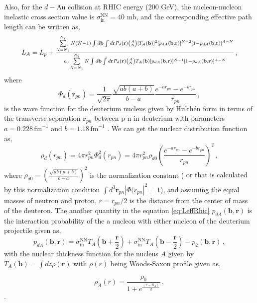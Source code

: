 \documentclass[11pt,onecolumn]{article}
\newcommand{\redflag}[1]{{\color{red} #1}}
\newcommand{\beq}{\begin{equation}}
\newcommand{\eeq}{\end{equation}}
\begin{document}
Also, for the $d-$Au collision at RHIC energy (200 GeV), the nucleon-nucleon inelastic cross section value is $\sigma^{\text{NN}}_{\text{in}} = 40$ mb, and the corresponding effective path length can be written as,
\beq
\resizebox{.9\hsize}{!}{$
L_A = L_p + \frac{\sum\limits_{N=N_1}^{N_2} N(N-1) \int d\textbf{b} \int d\textbf{r} P_d(\textbf{r}) \binom{A}{N} [T_A(\textbf{b})]^2 [p_{dA}(\textbf{b},\textbf{r})]^{N-2} [1-p_{dA}(\textbf{b},\textbf{r})]^{A-N} }{\rho_0 \sum\limits_{N=N_1}^{N_2} N \int d\textbf{b} \int d\textbf{r} P_d(\textbf{r}) \binom{A}{N} T_A(\textbf{b}) [p_{dA}(\textbf{b},\textbf{r})]^{N-1} [1-p_{dA}(\textbf{b},\textbf{r})]^{A-N}} \, ,
$}
\label{eq:LeffRhic}
\eeq
%
where 
%
\beq
\Phi_d(\textbf{r}_{pn}) = \frac{1}{\sqrt{2\pi}} \frac{\sqrt{ab (a+b)}}{b-a}  \frac{e^{-ar_{pn}}-e^{-br_{pn}}}{r_{pn}} \, ,
\label{eq:deuteriumWF}
\eeq
%
is the wave function for the \href{https://www.bnl.gov/userscenter/thesis/past-competitions/2022/thesis/thesis_niveditha_ramasubramanian.pdf}{deuterium nucleus} given by Hulth\'en form \cite{Miller:2007ri, 2021APS..DNP.QH004R} in terms of the transverse separation $\textbf{r}_{pn}$ between p-n in deuterium with parameters $a = 0.228 \, \text{fm}^{-1}$ and $b = 1.18 \, \text{fm}^{-1}$ \cite{PHENIX:2003qdw}. We can get the nuclear distribution function as,
%
\beq
\rho_d(r_{pn}) = 4\pi r_{pn}^2 \Phi_d^2(r_{pn}) = 4 \pi r_{pn}^2 \rho_{d0}\left( \frac{e^{-ar_{pn}}-e^{-br_{pn}}}{r_{pn}} \right)^2 \, ,
\label{eq:deuteronDensity}
\eeq
%
where $\rho_{d0} = \left( \frac{\sqrt{ab (a+b)}}{b-a} \right)^2$ is the normalization constant (\redflag{or that is calculated by this normalization condition $\int d^3 \textbf{r}_{pn} |\Phi(r_{pn}|^2 = 1 $}), and assuming the equal masses of neutron and proton, $r = r_{pn}/2$ is the distance from the center of mass of the deuteron. The another quantity in the equation \eqref{eq:LeffRhic} $p_{dA}(\textbf{b},\textbf{r})$ is the interaction probability of the a nucleon with either nucleon of the deuterium projectile given as,
%
\beq
p_{dA}(\textbf{b},\textbf{r}) = \sigma^{\text{NN}}_{\text{in}} T_A(\textbf{b}+\frac{\textbf{r}}{2}) + \sigma^{\text{NN}}_{\text{in}} T_A(\textbf{b}-\frac{\textbf{r}}{2}) - p_2(\textbf{b},\textbf{r}) \, ,
\eeq
%
with the nuclear thickness function for the nucleus $A$ given by $T_A(\textbf{b}) = \int d z \rho(\textbf{r})$ with $\rho(r)$ being Woods-Saxon profile given as,

\beq
\rho_A(r) = \frac{\rho_0}{1+e^{\frac{(r-R_A)}{d}}} \, ,
\label{eq:woodsaxon}
\eeq 
.
\end{document}
